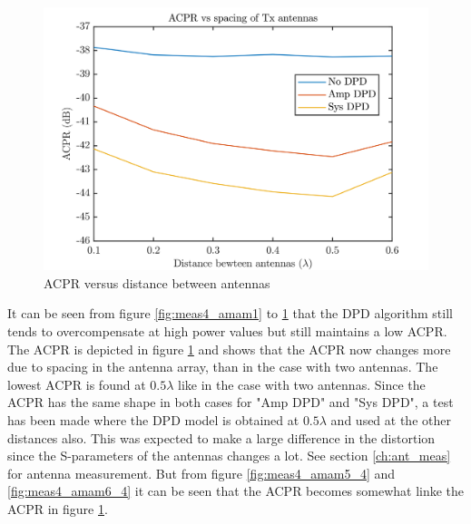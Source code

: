 \begin{figure}[H]
\centering 
\includegraphics[scale = 0.6]{figures/measurement/cree/meas4/acpr_four_ant.png}
\caption{ACPR versus distance between antennas}
\label{fig:meas4_dpd}
\end{figure}

It can be seen from figure \ref{fig:meas4_amam1} to \ref{fig:meas4_dpd} that the DPD algorithm still tends to overcompensate at high power values but still maintains a low ACPR. The ACPR is depicted in figure \ref{fig:meas4_dpd} and shows that the ACPR now changes more due to spacing in the antenna array, than in the case with two antennas. The lowest ACPR is found at $0.5\lambda$ like in the case with two antennas. Since the ACPR has the same shape in both cases for "Amp DPD" and "Sys DPD", a test has been made where the DPD model is obtained at $0.5\lambda$ and used at the other distances also. This was expected to make a large difference in the distortion since the S-parameters of the antennas changes a lot. See section \ref{ch:ant_meas} for antenna measurement. But from figure \ref{fig:meas4_amam5_4} and \ref{fig:meas4_amam6_4} it can be seen that the ACPR becomes somewhat linke the ACPR in figure \ref{fig:meas4_dpd}.

